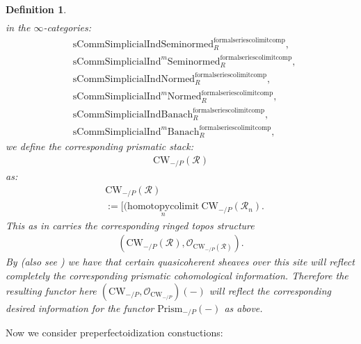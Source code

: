 \documentclass[12pt]{book}
\newtheorem{definition}{Definition}
\begin{document}
\begin{definition}
\begin{align}
\end{align}
in the $\infty$-categories:
\begin{align}
&\mathrm{sComm}\mathrm{Simplicial}\mathrm{Ind}\mathrm{Seminormed}^\mathrm{formalseriescolimitcomp}_R,\\
&\mathrm{sComm}\mathrm{Simplicial}\mathrm{Ind}^m\mathrm{Seminormed}^\mathrm{formalseriescolimitcomp}_R,\\
&\mathrm{sComm}\mathrm{Simplicial}\mathrm{Ind}\mathrm{Normed}^\mathrm{formalseriescolimitcomp}_R,\\
&\mathrm{sComm}\mathrm{Simplicial}\mathrm{Ind}^m\mathrm{Normed}^\mathrm{formalseriescolimitcomp}_R,\\
&\mathrm{sComm}\mathrm{Simplicial}\mathrm{Ind}\mathrm{Banach}^\mathrm{formalseriescolimitcomp}_R,\\
&\mathrm{sComm}\mathrm{Simplicial}\mathrm{Ind}^m\mathrm{Banach}^\mathrm{formalseriescolimitcomp}_R,	
\end{align}	
we define the corresponding prismatic stack:
\begin{align}
\mathrm{CW}_{-/P}(\mathcal{R})
\end{align}
as:
\begin{align}
&\mathrm{CW}_{-/P}(\mathcal{R})\\
&:=[(\underset{n}{\mathrm{homotopycolimit}}~ \mathrm{CW}_{-/P}(\mathcal{R}_n).	
\end{align}
This as in \cite[Definition 3.1, Variant 5.1]{BL} carries the corresponding ringed topos structure 
\begin{align}
(\mathrm{CW}_{-/P}(\mathcal{R}),\mathcal{O}_{\mathrm{CW}_{-/P}(\mathcal{R})}). 
\end{align}
By \cite[Proposition 8.15]{BL} (also see \cite{Dr1}) we have that certain quasicoherent sheaves over this site will reflect completely the corresponding prismatic cohomological information. Therefore the resulting functor here $(\mathrm{CW}_{-/P},\mathcal{O}_{\mathrm{CW}_{-/P}})(-)$ will reflect the corresponding desired information for the functor $\mathrm{Prism}_{-/P}(-)$ as above.
\end{definition}

\indent Now we consider preperfectoidization constuctions:
\end{document}

